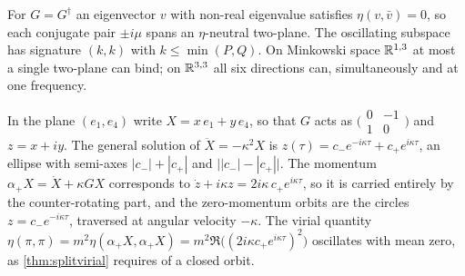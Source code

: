 \begin{proposition}
\label{prop:howmuch}
For $G=G^\dagger$ an eigenvector $v$ with non-real eigenvalue satisfies $\eta(v,\bar v)=0$, so each conjugate pair $\pm i\mu$ spans an
$\eta$-neutral two-plane. The oscillating subspace has signature $(k,k)$ with $k\le\min(P,Q)$. On Minkowski space $\mathbb{R}^{1,3}$ at most a
single two-plane can bind; on $\mathbb{R}^{3,3}$ all six directions can, simultaneously and at one frequency.
\end{proposition}

\begin{example}
\label{ex:oneplane}
In the plane $(e_1,e_4)$ write $X=x\,e_1+y\,e_4$, so that $G$ acts as $\bigl(\begin{smallmatrix}0&-1\\1&0\end{smallmatrix}\bigr)$ and $z=x+iy$. The
general solution of $\ddot X=-\kappa^2X$ is $z(\tau)=c_-e^{-i\kappa\tau}+c_+e^{i\kappa\tau}$, an ellipse with semi-axes $|c_-|+|c_+|$ and
$\bigl||c_-|-|c_+|\bigr|$. The momentum $\alpha_+X=\dot X+\kappa GX$ corresponds to $\dot z+i\kappa z=2i\kappa\,c_+e^{i\kappa\tau}$, so it is carried
entirely by the counter-rotating part, and the zero-momentum orbits are the circles $z=c_-e^{-i\kappa\tau}$, traversed at angular velocity
$-\kappa$. The virial quantity $\eta(\pi,\pi)=m^2\eta(\alpha_+X,\alpha_+X)=m^2\Re\bigl((2i\kappa c_+e^{i\kappa\tau})^2\bigr)$ oscillates with mean
zero, as \cref{thm:splitvirial} requires of a closed orbit.
\end{example}

